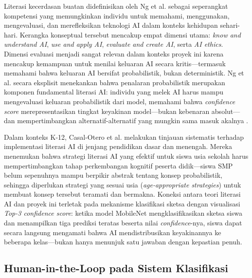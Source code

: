 \documentclass[12pt,a4paper,oneside,openany]{report}
\begin{document}
Literasi kecerdasan buatan didefinisikan oleh Ng et al. \cite{ref1} sebagai seperangkat kompetensi yang memungkinkan individu untuk memahami, menggunakan, mengevaluasi, dan merefleksikan teknologi AI dalam konteks kehidupan sehari-hari. Kerangka konseptual tersebut mencakup empat dimensi utama: \textit{know and understand AI}, \textit{use and apply AI}, \textit{evaluate and create AI}, serta \textit{AI ethics}. Dimensi evaluasi menjadi sangat relevan dalam konteks proyek ini karena mencakup kemampuan untuk menilai keluaran AI secara kritis---termasuk memahami bahwa keluaran AI bersifat probabilistik, bukan deterministik. Ng et al. secara eksplisit menekankan bahwa penalaran probabilistik merupakan komponen fundamental literasi AI: individu yang melek AI harus mampu mengevaluasi keluaran probabilistik dari model, memahami bahwa \textit{confidence score} merepresentasikan tingkat keyakinan model---bukan kebenaran absolut---dan mempertimbangkan alternatif-alternatif yang mungkin sama masuk akalnya \cite{ref1}.

Dalam konteks K-12, Casal-Otero et al. \cite{ref2} melakukan tinjauan sistematis terhadap implementasi literasi AI di jenjang pendidikan dasar dan menengah. Mereka menemukan bahwa strategi literasi AI yang efektif untuk siswa usia sekolah harus mempertimbangkan tahap perkembangan kognitif peserta didik---siswa SMP belum sepenuhnya mampu berpikir abstrak tentang konsep probabilistik, sehingga diperlukan strategi yang sesuai usia (\textit{age-appropriate strategies}) untuk membuat konsep tersebut teramati dan bermakna. Koneksi antara teori literasi AI dan proyek ini terletak pada mekanisme klasifikasi sketsa dengan visualisasi \textit{Top-3 confidence score}: ketika model MobileNet mengklasifikasikan sketsa siswa dan menampilkan tiga prediksi teratas beserta nilai \textit{confidence}-nya, siswa dapat secara langsung mengamati bahwa AI mendistribusikan keyakinannya ke beberapa kelas---bukan hanya menunjuk satu jawaban dengan kepastian penuh.

\subsection{Human-in-the-Loop pada Sistem Klasifikasi}
\label{subsec:hitl-klasifikasi}
\end{document}
